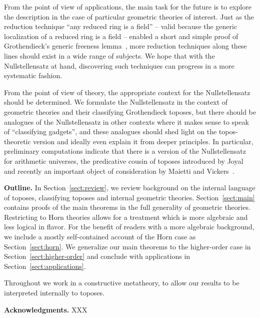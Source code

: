 \documentclass[oneside,reqno]{amsart}
\theoremstyle{definition}
\theoremstyle{plain}
\theoremstyle{remark}
\renewcommand{\_}{\mathpunct{.}\,}
\newcommand{\?}{\,{:}\,}
\renewcommand{\paragraph}[1]{\noindent\textbf{#1.}}
\begin{document}
From the point of view of applications, the main task for the future is to
explore the description in the case of particular geometric theories of
interest. Just as the reduction technique ``any reduced ring is a field'' --
valid because the generic localization of a reduced ring is a field -- enabled
a short and simple proof of Grothendieck's generic freeness
lemma~\cite[Section~11.5]{blechschmidt:phd}, more reduction techniques along
these lines should exist in a wide range of subjects. We hope that with the
Nullstellensatz at hand, discovering such techniques can progress in a more
systematic fashion.

From the point of view of theory, the appropriate context for the
Nullstellensatz should be determined. We formulate the Nullstellensatz in the
context of geometric theories and their classifying Grothendieck toposes, but
there should be analogues of the Nullstellensatz in other contexts where it
makes sense to speak of ``classifying gadgets'', and these analogues should
shed light on the topos-theoretic version and ideally even explain it from deeper
principles. In particular, preliminary computations indicate that there is a
version of the Nullstellensatz for arithmetic universes, the predicative cousin
of toposes introduced by Joyal and recently an important object of
consideration by Maietti and Vickers~\cite{maietti:au,maietti-vickers:induction,vickers:sketches}.
\medskip


\paragraph{Outline} In Section~\ref{sect:review}, we review background on the
internal language of toposes, classifying toposes and internal geometric theories.
Section~\ref{sect:main} contains proofs of the main theorems in the
full generality of geometric theories. Restricting to Horn theories allows for
a treatment which is more algebraic and less logical in flavor. For the benefit
of readers with a more algebraic background, we include a mostly self-contained
account of the Horn case as Section~\ref{sect:horn}. We generalize our main
theorems to the higher-order case in Section~\ref{sect:higher-order} and
conclude with applications in Section~\ref{sect:applications}.

Throughout we work in a constructive metatheory, to allow our results to be
interpreted internally to toposes.
\medskip


\paragraph{Acknowledgments} XXX
\end{document}
